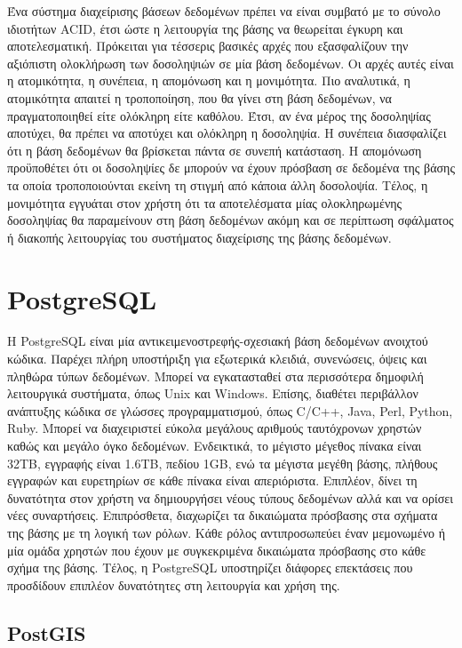 Ένα σύστημα διαχείρισης βάσεων δεδομένων πρέπει να είναι συμβατό με το σύνολο ιδιοτήτων ACID, έτσι ώστε η λειτουργία της βάσης να θεωρείται έγκυρη και αποτελεσματική. 
Πρόκειται για τέσσερις βασικές αρχές που εξασφαλίζουν την αξιόπιστη ολοκλήρωση των δοσοληψιών σε μία βάση δεδομένων. Οι αρχές αυτές είναι η ατομικότητα, η συνέπεια, 
η απομόνωση και η μονιμότητα. Πιο αναλυτικά, η ατομικότητα απαιτεί η τροποποίηση, που θα γίνει στη βάση δεδομένων, να πραγματοποιηθεί είτε ολόκληρη είτε καθόλου. 
Έτσι, αν ένα μέρος της δοσοληψίας αποτύχει, θα πρέπει να αποτύχει και ολόκληρη η δοσοληψία. Η συνέπεια διασφαλίζει ότι η βάση δεδομένων θα βρίσκεται πάντα σε συνεπή 
κατάσταση. Η απομόνωση προϋποθέτει ότι οι δοσοληψίες δε μπορούν να έχουν πρόσβαση σε δεδομένα της βάσης τα οποία τροποποιούνται εκείνη τη στιγμή από κάποια άλλη δοσολοψία. 
Τέλος, η μονιμότητα εγγυάται στον χρήστη ότι τα αποτελέσματα μίας ολοκληρωμένης δοσοληψίας θα παραμείνουν στη βάση δεδομένων ακόμη και σε περίπτωση σφάλματος ή 
διακοπής λειτουργίας του συστήματος διαχείρισης της βάσης δεδομένων. 


\section{PostgreSQL}

Η PostgreSQL είναι μία αντικειμενοστρεφής-σχεσιακή βάση δεδομένων ανοιχτού κώδικα. Παρέχει πλήρη υποστήριξη για εξωτερικά κλειδιά, συνενώσεις, όψεις και πληθώρα 
τύπων δεδομένων. Μπορεί να εγκατασταθεί στα περισσότερα δημοφιλή λειτουργικά συστήματα, όπως Unix και Windows. Επίσης, διαθέτει περιβάλλον ανάπτυξης κώδικα σε γλώσσες 
προγραμματισμού, όπως C/C++, Java, Perl, Python, Ruby. Μπορεί να διαχειριστεί εύκολα μεγάλους αριθμούς ταυτόχρονων χρηστών καθώς και μεγάλο όγκο δεδομένων. Ενδεικτικά, 
το μέγιστο μέγεθος πίνακα είναι 32ΤΒ, εγγραφής είναι 1.6ΤΒ, πεδίου 1GB, ενώ τα μέγιστα μεγέθη βάσης, πλήθους εγγραφών και ευρετηρίων σε κάθε πίνακα είναι απεριόριστα. 
Επιπλέον, δίνει τη δυνατότητα στον χρήστη να δημιουργήσει νέους τύπους δεδομένων αλλά και να ορίσει νέες συναρτήσεις. Επιπρόσθετα, διαχωρίζει τα δικαιώματα πρόσβασης στα 
σχήματα της βάσης με τη λογική των ρόλων. Κάθε ρόλος αντιπροσωπεύει έναν μεμονωμένο ή μία ομάδα χρηστών που έχουν με συγκεκριμένα δικαιώματα πρόσβασης στο κάθε σχήμα 
της βάσης. Τέλος, η PostgreSQL υποστηρίζει διάφορες επεκτάσεις που προσδίδουν επιπλέον δυνατότητες στη λειτουργία και χρήση της.

\subsection{PostGIS}

